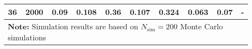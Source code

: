 \begin{landscape}
\begin{table}[!h]
\begin{tabular}{cccccccccc}
	 36  & 2000 &         0.09          & 0.108                                 &                       0.36                       &                     0.107                      &                      0.324                       & \textbf{0.063}           &            0.07            & -                 \\
	\hline
	\hline
    \multicolumn{10}{l}{\textbf{Note:} Simulation results are based on $N_\text{sim} = 200$ Monte Carlo simulations}
    \end{tabular}
    \end{table}
    \egroup
\end{landscape}
    